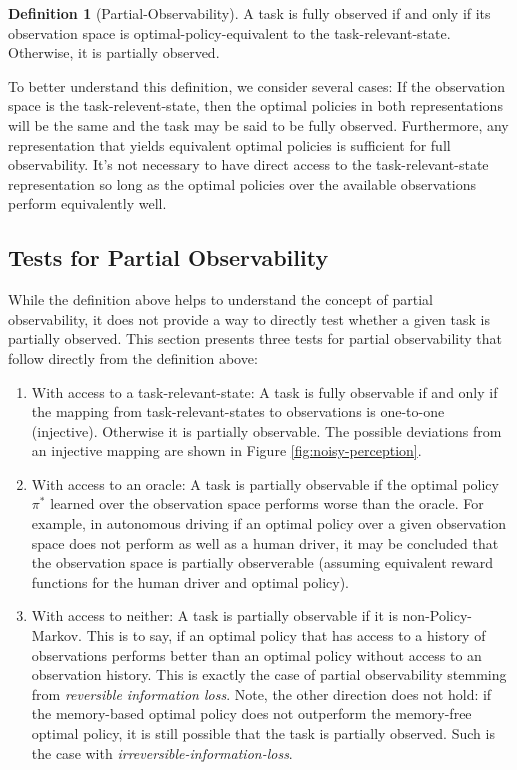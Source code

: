 \documentclass{article} %
\theoremstyle{definition}
\newtheorem{definition}{Definition}[section]
\begin{document}
\begin{definition}[Partial-Observability]
\label{def:PO}
A task is fully observed if and only if its observation space is
optimal-policy-equivalent to the task-relevant-state. Otherwise, it is
partially observed.
\end{definition}

To better understand this definition, we consider several cases: If
the observation space is the task-relevent-state, then the optimal
policies in both representations will be the same and the task may be
said to be fully observed. Furthermore, any representation that yields
equivalent optimal policies is sufficient for full observability. It's
not necessary to have direct access to the task-relevant-state
representation so long as the optimal policies over the available
observations perform equivalently well.

\subsection{Tests for Partial Observability}
While the definition above helps to understand the concept of partial
observability, it does not provide a way to directly test whether a
given task is partially observed. This section presents three tests
for partial observability that follow directly from the definition
above:

\begin{enumerate}
\item With access to a task-relevant-state: A task is fully observable
  if and only if the mapping from task-relevant-states to observations
  is one-to-one (injective). Otherwise it is partially observable. The
  possible deviations from an injective mapping are shown in Figure
  \ref{fig:noisy-perception}.
\item With access to an oracle: A task is partially observable if the
  optimal policy $\pi^*$ learned over the observation space performs
  worse than the oracle. For example, in autonomous driving if an
  optimal policy over a given observation space does not perform as
  well as a human driver, it may be concluded that the observation
  space is partially observerable (assuming equivalent reward
  functions for the human driver and optimal policy).
\item With access to neither: A task is partially observable if it is
  non-Policy-Markov. This is to say, if an optimal policy that has
  access to a history of observations performs better than an optimal
  policy without access to an observation history. This is exactly the
  case of partial observability stemming from \textit{reversible
    information loss}. Note, the other direction does not hold: if the
  memory-based optimal policy does not outperform the memory-free
  optimal policy, it is still possible that the task is partially
  observed. Such is the case with
  \textit{irreversible-information-loss}.
\end{enumerate}
\end{document}
